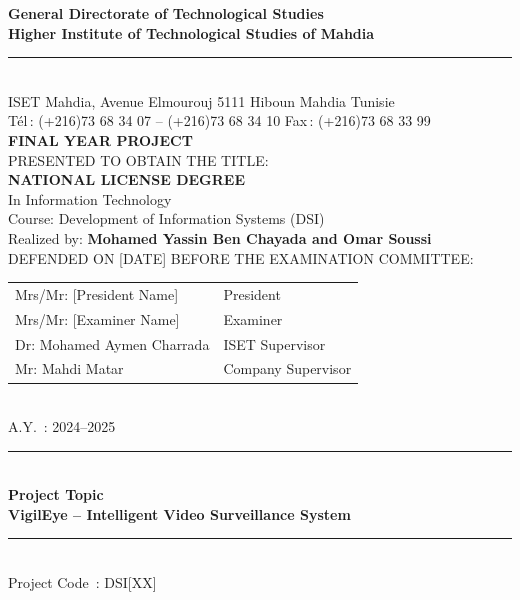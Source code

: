 \documentclass[12pt,a4paper,oneside]{report}
\begin{document}
\begin{titlepage}
\begin{center}
\textbf{General Directorate of Technological Studies}\\[4pt]
\textbf{Higher Institute of Technological Studies of Mahdia}\\[6pt]
\rule{\textwidth}{0.4pt}\\[12pt]
{\small ISET Mahdia, Avenue Elmourouj 5111 Hiboun Mahdia Tunisie\\
T\'{e}l\,: (+216)73 68 34 07 -- (+216)73 68 34 10 \quad Fax\,: (+216)73 68 33 99}\\[24pt]
{\Large\bfseries FINAL YEAR PROJECT}\\[12pt]
{\normalsize PRESENTED TO OBTAIN THE TITLE:}\\[6pt]
{\large\bfseries NATIONAL LICENSE DEGREE}\\[6pt]
{\normalsize In Information Technology}\\[4pt]
{\normalsize Course: Development of Information Systems (DSI)}\\[20pt]
{\normalsize Realized by: \textbf{Mohamed Yassin Ben Chayada and Omar Soussi}}\\[24pt]
{\normalsize DEFENDED ON [DATE] BEFORE THE EXAMINATION COMMITTEE:}\\[10pt]
\begin{tabular}{ll}
Mrs/Mr: [President Name]    & President \\
Mrs/Mr: [Examiner Name]     & Examiner  \\
Dr: Mohamed Aymen Charrada  & ISET Supervisor \\
Mr: Mahdi Matar             & Company Supervisor \\
\end{tabular}\\[20pt]
{\normalsize A.Y.~: 2024--2025}\\[24pt]
\rule{\textwidth}{0.8pt}\\[10pt]
{\LARGE\bfseries Project Topic}\\[8pt]
{\Large\bfseries VigilEye -- Intelligent Video Surveillance System}\\[8pt]
\rule{\textwidth}{0.8pt}\\[10pt]
{\normalsize Project Code~: DSI[XX]}
\end{center}
\end{titlepage}
\end{document}
